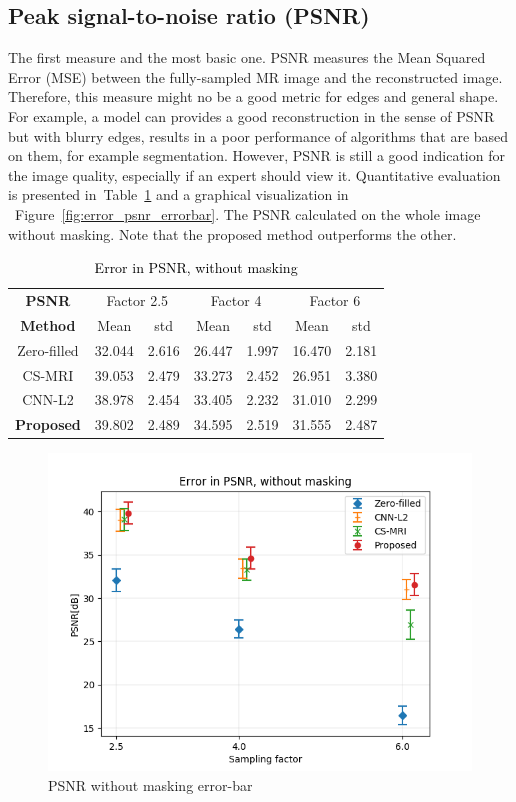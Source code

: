 \documentclass[review]{elsarticle}
\begin{document}
\subsection{Peak signal-to-noise ratio (PSNR)}
The first measure and the most basic one. PSNR measures the Mean Squared Error (MSE) between the fully-sampled MR image and the reconstructed image. Therefore, this measure might no be a good metric for edges and general shape. For example, a model can provides a good reconstruction in the sense of PSNR but with blurry edges, results in a poor performance of algorithms that are based on them, for example segmentation.
However, PSNR is still a good indication for the image quality, especially if an expert should view it.
Quantitative evaluation is presented in~Table~\ref{tbl:PSNR_NO_MASK} and a graphical visualization in ~Figure~\ref{fig:error_psnr_errorbar}. The PSNR calculated on the whole image without masking. Note that the proposed method outperforms the other.

\begin{table}[H]
	\centering{}
\begin{tabular}{|c||c|c||c|c||c|c|}
	\hline 
	\textbf{PSNR} & \multicolumn{2}{c||}{Factor 2.5} & \multicolumn{2}{c||}{Factor 4} & \multicolumn{2}{c|}{Factor 6}\tabularnewline \cline{2-7}

	\textbf{Method}     &Mean   &std    &Mean   &std     &Mean   &std \tabularnewline \hline 	
	Zero-filled         &32.044 &2.616  &26.447 &1.997   &16.470 &2.181\tabularnewline
	CS-MRI              &39.053 &2.479  &33.273 &2.452   &26.951 &3.380\tabularnewline
	CNN-L2              &38.978 &2.454  &33.405 &2.232   &31.010 &2.299\tabularnewline
	\textbf{Proposed}   &39.802 &2.489  &34.595 &2.519   &31.555 &2.487\tabularnewline
		\hline 
	\end{tabular}\caption{\textcolor{black}{\footnotesize{}{}Error in PSNR, without masking}{\footnotesize{}\label{tbl:PSNR_NO_MASK}}}
\end{table}

\begin{figure}[h]
\centering
\includegraphics[width=0.7\linewidth]{include/grp2/error_psnr_errorbar}
\caption{PSNR without masking error-bar}
\end{figure}\label{fig:error_psnr_errorbar}
\end{document}
